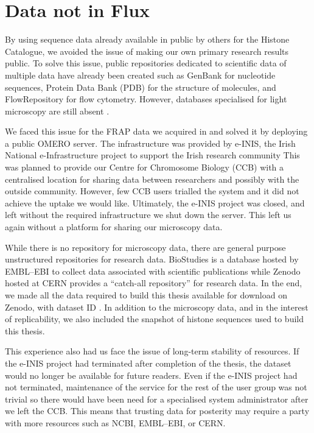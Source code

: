 \section{Data not in Flux}

By using sequence data already available in public by others for the
Histone Catalogue, we avoided the issue
of making our own primary research results public.
To solve this issue, public repositories dedicated to scientific data
of multiple data have already been created such as GenBank for
nucleotide sequences, Protein Data Bank (PDB) for the structure of
molecules, and FlowRepository for flow cytometry.  However, databases
specialised for light microscopy are still absent
\citep{image-data-need-home}.

We faced this issue for the FRAP data
we acquired in  and solved it by deploying
a public OMERO server.
The infrastructure was provided by
e-INIS, the Irish National e-Infrastructure project to support the
Irish research community
This was planned to provide our Centre for Chromosome Biology (CCB)
with a centralised location for sharing data between researchers
and possibly with the outside community.
However, few CCB users
trialled the system and it did not achieve the uptake we would like.
Ultimately, the e-INIS project was closed, and left without the
required infrastructure we
shut down the server.  This left us again without a platform for
sharing our microscopy data.

While there is no repository for microscopy data, there are general
purpose unstructured repositories for research data.  BioStudies is a
database hosted by EMBL--EBI to collect data associated with
scientific publications \citep{mcentyre2015biostudies} while Zenodo
hosted at CERN provides a ``catch-all repository'' for research data.
In the end, we made all the data required to build this thesis
available for download on Zenodo, with dataset ID .  In addition to the microscopy data, and in the
interest of replicability, we also included the snapshot of histone
sequences used to build this thesis.

This experience also had us face the issue of long-term stability of
resources.  If the e-INIS project had terminated after completion of
the thesis, the dataset would no longer be available for future
readers.  Even if the e-INIS project had not terminated, maintenance
of the service for the rest of the user group was not trivial so there
would have been need for a specialised system administrator after we
left the CCB.  This means that trusting data for posterity may require
a party with more resources such as NCBI, EMBL--EBI, or CERN.

